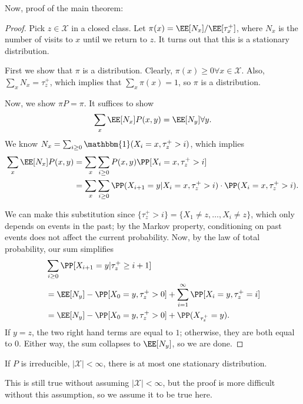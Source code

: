 Now, proof of the main theorem: 
\begin{proof}
Pick $z\in \mathcal{X}$ in a closed class. Let $\pi(x) = \EE[N_x]/\EE[\tau_x^+]$, where $N_x$ is the number of visits to $x$ until we return to $z$. It turns out that this is a stationary distribution. 

First we show that $\pi$ is a distribution. Clearly, $\pi(x)\geq 0\forall x\in \mathcal{X}$. Also, $\sum_x N_x = \tau_z^+$, which implies that $\sum_x\pi(x) = 1$, so $\pi$ is a distribution.

Now, we show $\pi P=\pi$. It suffices to show 
\[\sum_x \EE[N_x]P(x,y) = \EE[N_y] \forall y.\]
We know $N_x = \sum_{i\geq 0}\mathbbm{1}(X_i=x, \tau_z^+>i)$, which implies
\begin{align*}
    \sum_x\EE[N_x]P(x,y) &= \sum_x\sum_{i\geq 0}P(x,y)\PP[X_i=x,\tau_z^+>i] \\
    &= \sum_x\sum_{i\geq 0}\PP(X_{i+1}=y|X_i=x, \tau_z^+>i)\cdot \PP(X_i=x,\tau_z^+>i).
\end{align*}

We can make this substitution since $\{\tau_z^+>i\}=\{X_1\neq z, \hdots, X_i\neq z\}$, which only depends on events in the past; by the Markov property, conditioning on past events does not affect the current probability. Now, by the law of total probability, our sum simplifies
\begin{align*}
    &\sum_{i\geq 0} \PP[X_{i+1}=y | \tau_z^+ \geq i+1] \\
    &= \EE[N_y] - \PP[X_0=y, \tau_z^+>0] + \sum_{i=1}^\infty \PP[X_i=y, \tau_z^+=i] \\
    &= \EE[N_y] - \PP[X_0=y, \tau_z^+>0] + \PP(X_{\tau_z^+}=y). 
\end{align*}
If $y=z$, the two right hand terms are equal to $1$; otherwise, they are both equal to $0$. Either way, the sum collapses to $\EE[N_y]$, so we are done.  
\end{proof}

\begin{theorem}
\thmlabel

If $P$ is irreducible, $\vert \mathcal{X}\vert < \infty$, there is at most one stationary distribution. 
\end{theorem}

This is still true without assuming $\vert \mathcal{X}\vert < \infty$, but the proof is more difficult without this assumption, so we assume it to be true here. 

